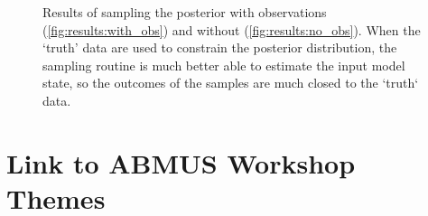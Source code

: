 \documentclass[runningheads]{llncs}
\begin{document}
\begin{figure}%
\centering
{}
\caption{Results of sampling the posterior with observations (\ref{fig:results:with_obs}) and without (\ref{fig:results:no_obs}). When the `truth' data are used to constrain the posterior distribution, the sampling routine is much better able to estimate the input model state, so the outcomes of the samples are much closed to the `truth` data.} 
\label{fig:model_uncertainty}
\end{figure}


\section{Link to ABMUS Workshop Themes}
\end{document}
